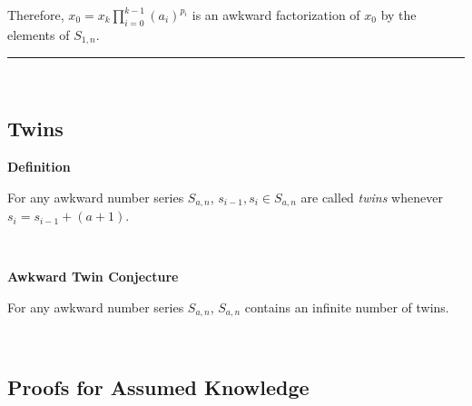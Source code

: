 \documentclass[a4paper,12pt]{article}
\begin{document}
\noindent Therefore, $\displaystyle x_0 = x_{k} \prod_{i = 0}^{k - 1} (a_i)^{p_i}$ is an awkward factorization of $x_0$ by the elements of $S_{1, n}$.


\begin{center}
\noindent\rule{8cm}{0.4pt}
\end{center}
\noindent \\
















\subsection{Twins}
\label{subsection:twins}





\label{definition:twins}
\hypertarget{definition:twins}{}
\begin{tcolorbox}
\textbf{Definition}

For any awkward number series $S_{a,n}$, $s_{i - 1}, s_i \in S_{a,n}$ are called \textit{twins} whenever $s_i = s_{i - 1} + (a + 1)$.

\end{tcolorbox}
\noindent \\










\label{conjecture:twin_conjecture}
\hypertarget{conjecture:twin_conjecture}{}
\begin{tcolorbox}
\textbf{Awkward Twin Conjecture}

For any awkward number series $S_{a,n}$, $S_{a, n}$ contains an infinite number of twins.

\end{tcolorbox}
\noindent \\








\subsection{Proofs for Assumed Knowledge}
\label{subsection:assumed_knowledge_proofs}
\end{document}
